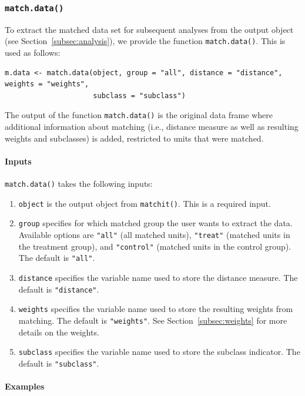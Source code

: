 \documentclass[oneside,letterpaper,titlepage]{article}
\begin{document}
\subsubsection{{\tt match.data()}}
\label{subsec:match.data}

To extract the matched data set for subsequent analyses from the
output object (see Section~\ref{subsec:analysis}), we provide the
function {\tt match.data()}.  This is used as follows:
\begin{verbatim}
m.data <- match.data(object, group = "all", distance = "distance", weights = "weights",
                     subclass = "subclass")
\end{verbatim}
The output of the function {\tt match.data()} is the original data
frame where additional information about matching (i.e., distance
measure as well as resulting weights and subclasses) is added,
restricted to units that were matched.

\paragraph{Inputs}

{\tt match.data()} takes the following inputs:
\begin{enumerate}
\item {\tt object} is the output object from {\tt matchit()}. This is
  a required input.
\item {\tt group} specifies for which matched group the user wants to
  extract the data. Available options are {\tt "all"} (all matched
  units), {\tt "treat"} (matched units in the treatment group), and
  {\tt "control"} (matched units in the control group). The default is
  {\tt "all"}.
\item {\tt distance} specifies the variable name used to store the
  distance measure. The default is {\tt "distance"}.
\item {\tt weights} specifies the variable name used to store the
  resulting weights from matching. The default is {\tt "weights"}. See
  Section~\ref{subsec:weights} for more details on the weights.
\item {\tt subclass} specifies the variable name used to store the
  subclass indicator. The default is {\tt "subclass"}.
\end{enumerate}

\paragraph{Examples}
\end{document}
